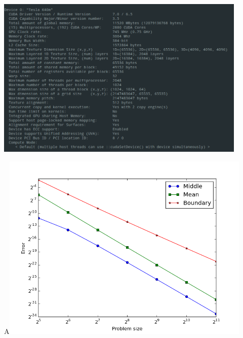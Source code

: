 \documentclass[10pt]{beamer}
\begin{document}
\begin{frame}
\centering
\includegraphics[width=0.9\textwidth]{img/device-query.png}
\end{frame}

\begin{frame}
\centering
A\includegraphics[width=0.9\textwidth]{img/err-rates.png}
\end{frame}
\end{document}
